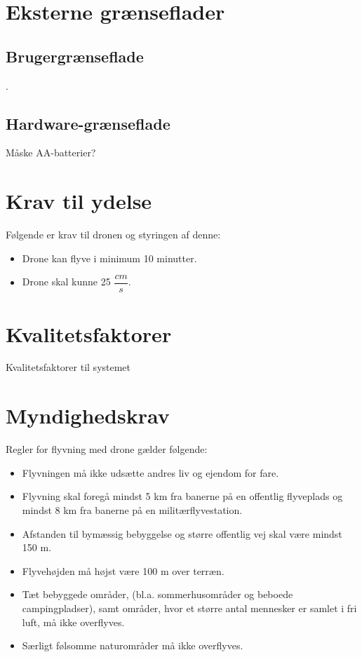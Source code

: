 \documentclass[Main]{subfiles}
\begin{document}
\chapter{Eksterne grænseflader}

\section{Brugergrænseflade}
.

\section{Hardware-grænseflade}
Måske AA-batterier?





\chapter{Krav til ydelse}
Følgende er krav til dronen og styringen af denne:

	\begin{itemize}
	\item Drone kan flyve i minimum 10 minutter.
	\item Drone skal kunne 25 $\dfrac{cm}{s}$.
	\end{itemize}



\chapter{Kvalitetsfaktorer}
Kvalitetsfaktorer til systemet

\chapter{Myndighedskrav}
Regler for flyvning med drone gælder følgende:

\begin{itemize}
\item Flyvningen må ikke udsætte andres liv og ejendom for fare\cite[s. 1]{Lov1}.
\item Flyvning skal foregå mindst 5 km fra banerne på en offentlig flyveplads og mindst 8 km fra banerne på en militærflyvestation\cite[s. 1]{Lov1}.
\item Afstanden til bymæssig bebyggelse og større offentlig vej skal være mindst 150 m\cite[s. 1]{Lov1}.
\item Flyvehøjden må højst være 100 m over terræn\cite[s. 2]{Lov1}.
\item Tæt bebyggede områder, (bl.a. sommerhusområder og beboede campingpladser), samt områder, hvor et større antal mennesker er samlet i fri luft, må ikke overflyves\cite[s. 2]{Lov1}.
\item Særligt følsomme naturområder må ikke overflyves\cite[s. 2]{Lov1}.
\end{itemize} 
\end{document}
